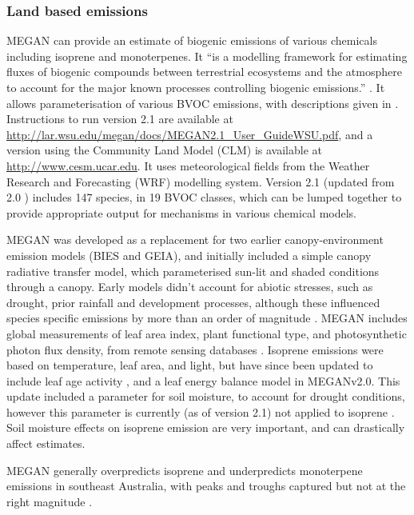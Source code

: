     \subsubsection{Land based emissions} %
      
      MEGAN can provide an estimate of biogenic emissions of various chemicals including isoprene and monoterpenes.
      It ``is a modelling framework for estimating fluxes of biogenic compounds between terrestrial ecosystems and the atmosphere to account for the major known processes controlling biogenic emissions.'' \citep{Guenther2012}.
      It allows parameterisation of various BVOC emissions, with descriptions given in \cite{Guenther2012}.
      Instructions to run version 2.1 are available at \url{http://lar.wsu.edu/megan/docs/MEGAN2.1_User_GuideWSU.pdf}, and a version using the Community Land Model (CLM) is available at \url{http://www.cesm.ucar.edu}.
      It uses meteorological fields from the Weather Research and Forecasting (WRF) modelling system.
      Version 2.1 (updated from 2.0 \citep{Guenther2006}) includes 147 species, in 19 BVOC classes, which can be lumped together to provide appropriate output for mechanisms in various chemical models.
      
      MEGAN was developed as a replacement for two earlier canopy-environment emission models (BIES and GEIA), and initially included a simple canopy radiative transfer model, which parameterised sun-lit and shaded conditions through a canopy.
      Early models didn't account for abiotic stresses, such as drought, prior rainfall and development processes, although these influenced species specific emissions by more than an order of magnitude \citep{Niinemets1999}.
      MEGAN includes global measurements of leaf area index, plant functional type, and photosynthetic photon flux density, from remote sensing databases \citep{Kefauver2014}.
      Isoprene emissions were based on temperature, leaf area, and light, but have since been updated to include leaf age activity \citep{Guenther2000}, and a leaf energy balance model \citep{Guenther2006} in MEGANv2.0.
      This update included a parameter for soil moisture, to account for drought conditions, however this parameter is currently (as of version 2.1) not applied to isoprene \citep{Sindelarova2014}.
      Soil moisture effects on isoprene emission are very important, and can drastically affect estimates.
      
      MEGAN generally overpredicts isoprene and underpredicts monoterpene emissions in southeast Australia, with peaks and troughs captured but not at the right magnitude \citep{Emmerson2016}.
      
